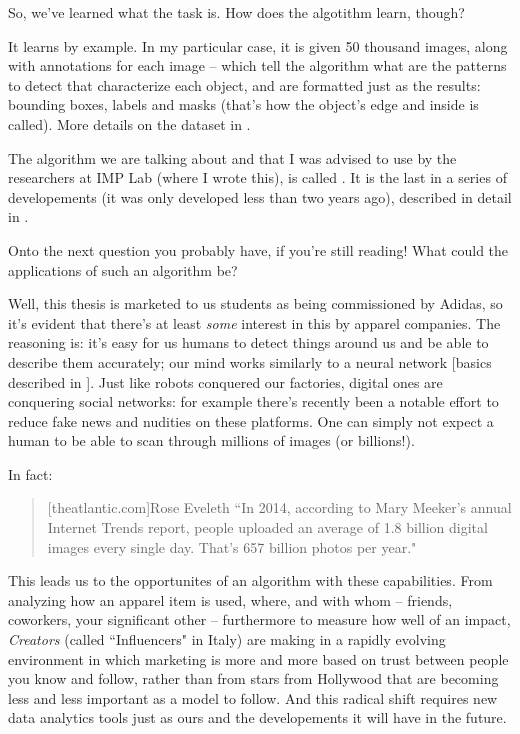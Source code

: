So, we've learned what the task is. How does the algotithm learn, though?

It learns by example. In my particular case, it is given 50 thousand images, along with annotations for each image -- which tell the algorithm what are the patterns to detect that characterize each object, and are formatted just as the results: bounding boxes, labels and masks (that's how the object's edge and inside is called). More details on the dataset in \modanet.

The algorithm we are talking about and that I was advised to use by the researchers at IMP Lab (where I wrote this), is called \maskrcnn. It is the last in a series of developements (it was only developed less than two years ago), described in detail in .

Onto the next question you probably have, if you're still reading!
What could the applications of such an algorithm be?

Well, this thesis is marketed to us students as being commissioned by Adidas, so it's evident that there's at least \emph{some} interest in this by apparel companies.
The reasoning is: it's easy for us humans to detect things around us and be able to describe them accurately; our mind works similarly to a neural network [basics described in ].
Just like robots conquered our factories, digital ones are conquering social networks:
for example there's recently been a notable effort to reduce fake news and nudities on these platforms. One can simply not expect a human to be able to scan through millions of images (or billions!). 

In fact:
\begin{quote}[theatlantic.com]{Rose Eveleth}
	“In 2014, according to Mary Meeker's annual Internet Trends report, people uploaded an average of 1.8 billion digital images every single day. That's 657 billion photos per year."
\end{quote}

This leads us to the opportunites of an algorithm with these capabilities.
From analyzing how an apparel item is used, where, and with whom -- friends, coworkers, your significant other -- furthermore to measure how well of an impact, \emph{Creators} (called “Influencers" in Italy) are making in a rapidly evolving environment in which marketing is more and more based on trust between people you know and follow, rather than from stars from Hollywood that are becoming less and less important as a model to follow.
And this radical shift requires new data analytics tools just as ours and the developements it will have in the future.


